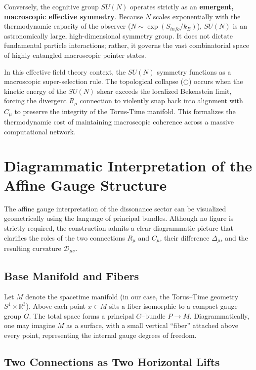 \documentclass[12pt,openany]{book}
\theoremstyle{plain}
\theoremstyle{definition}
\theoremstyle{remark}
\begin{document}
Conversely, the cognitive group $SU(N)$ operates strictly as an \textbf{emergent, macroscopic effective symmetry}. Because $N$ scales exponentially with the thermodynamic capacity of the observer ($N \sim \exp(S_{info}/k_B)$), $SU(N)$ is an astronomically large, high-dimensional symmetry group. It does not dictate fundamental particle interactions; rather, it governs the vast combinatorial space of highly entangled macroscopic pointer states. 

In this effective field theory context, the $SU(N)$ symmetry functions as a macroscopic super-selection rule. The topological collapse ($\bigcirc$) occurs when the kinetic energy of the $SU(N)$ shear exceeds the localized Bekenstein limit, forcing the divergent $R_\mu$ connection to violently snap back into alignment with $C_\mu$ to preserve the integrity of the Torus-Time manifold. This formalizes the thermodynamic cost of maintaining macroscopic coherence across a massive computational network.

\section{Diagrammatic Interpretation of the Affine Gauge Structure}

The affine gauge interpretation of the dissonance sector can be visualized
geometrically using the language of principal bundles. Although no figure is
strictly required, the construction admits a clear diagrammatic picture that
clarifies the roles of the two connections $R_\mu$ and $C_\mu$, their
difference $\Delta_\mu$, and the resulting curvature $\mathcal{D}_{\mu\nu}$.

\subsection*{Base Manifold and Fibers}

Let $M$ denote the spacetime manifold (in our case, the Torus--Time geometry
$S^1 \times \mathbb{R}^3$). Above each point $x \in M$ sits a fiber
isomorphic to a compact gauge group $G$. The total space forms a principal
$G$--bundle $P \to M$. Diagrammatically, one may imagine $M$ as a surface,
with a small vertical ``fiber'' attached above every point, representing the
internal gauge degrees of freedom.

\subsection*{Two Connections as Two Horizontal Lifts}
\end{document}
